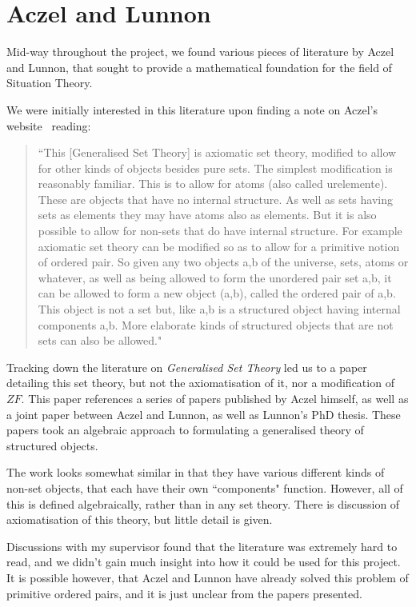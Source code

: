 \documentclass[11pt]{report}
\theoremstyle{definition}
\theoremstyle{theorem}
\theoremstyle{lemma}
\begin{document}
\section{Aczel and Lunnon}
Mid-way throughout the project, we found various pieces of literature by Aczel and Lunnon, that sought to provide a mathematical foundation for the field of Situation Theory.

We were initially interested in this literature upon finding a note on Aczel's website~\cite{aczelsite} reading: 
\begin{quotation}
\begin{small}
\noindent
``This [Generalised Set Theory] is axiomatic set theory, modified to allow for other kinds of objects besides pure sets. The simplest modification is reasonably familiar. This is to allow for atoms (also called urelemente). These are objects that have no internal structure. As well as sets having sets as elements they may have atoms also as elements. But it is also possible to allow for non-sets that do have internal structure. For example axiomatic set theory can be modified so as to allow for a primitive notion of ordered pair. So given any two objects a,b of the universe, sets, atoms or whatever, as well as being allowed to form the unordered pair set {a,b}, it can be allowed to form a new object (a,b), called the ordered pair of a,b. This object is not a set but, like {a,b} is a structured object having internal components a,b. More elaborate kinds of structured objects that are not sets can also be allowed."
\end{small}
\end{quotation}
Tracking down the literature on \emph{Generalised Set Theory} led us to a paper~\cite{gst} detailing this set theory, but not the axiomatisation of it, nor a modification of $ZF$. 
This paper references a series of papers published by Aczel himself, as well as a joint paper between Aczel and Lunnon, as well as Lunnon's PhD thesis.
These papers took an algebraic approach to formulating a generalised theory of structured objects.

The work looks somewhat similar in that they have various different kinds of non-set objects, that each have their own ``components" function. 
However, all of this is defined algebraically, rather than in any set theory. 
There is discussion of axiomatisation of this theory, but little detail is given. 

Discussions with my supervisor found that the literature was extremely hard to read, and we didn't gain much insight into how it could be used for this project.
It is possible however, that Aczel and Lunnon have already solved this problem of primitive ordered pairs, and it is just unclear from the papers presented. 
\end{document}
